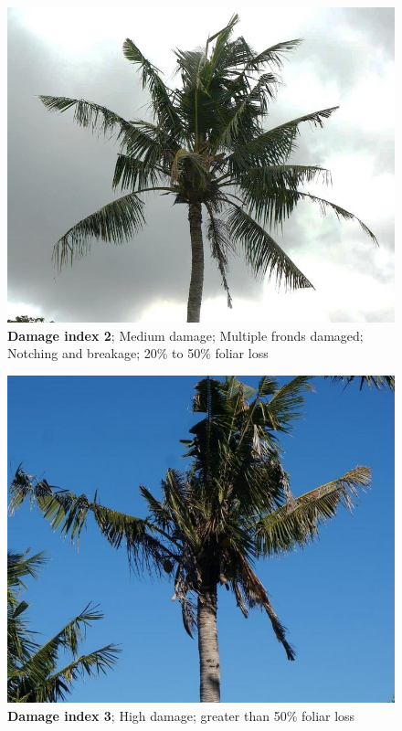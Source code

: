 \documentclass[twocolumn,letterpaper]{scrartcl}
\begin{document}
\begin{figure}[p]
	\centering
	\includegraphics[width=.8\linewidth]{images/j5index2.resized.png}
	\caption{\textbf{Damage index 2}; Medium damage; Multiple fronds damaged; Notching and breakage; 20\% to 50\% foliar loss}
	\label{fig:damage2}
\end{figure}

\begin{figure}[p]
	\centering
	\includegraphics[width=.8\linewidth]{images/j5index3.resized.png}
	\caption{\textbf{Damage index 3}; High damage; greater than 50\% foliar loss}
	\label{fig:damage3}
\end{figure}
\end{document}
